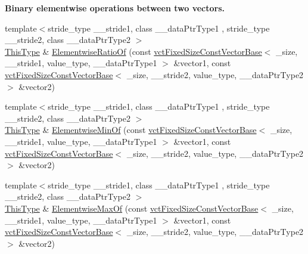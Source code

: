 \begin{Indent}{\bf Binary elementwise operations between two vectors.}
\begin{DoxyCompactItemize}
\item 
{\footnotesize template$<$stride\+\_\+type \+\_\+\+\_\+stride1, class \+\_\+\+\_\+data\+Ptr\+Type1 , stride\+\_\+type \+\_\+\+\_\+stride2, class \+\_\+\+\_\+data\+Ptr\+Type2 $>$ }\\\hyperlink{classvct_fixed_size_const_vector_base_a071063bc4fa43112cc287b2dbef53180}{This\+Type} \& \hyperlink{classvct_fixed_size_vector_base_ae9b3f8f5beb5abec1f56e4bb9e4ea083}{Elementwise\+Ratio\+Of} (const \hyperlink{classvct_fixed_size_const_vector_base}{vct\+Fixed\+Size\+Const\+Vector\+Base}$<$ \+\_\+size, \+\_\+\+\_\+stride1, value\+\_\+type, \+\_\+\+\_\+data\+Ptr\+Type1 $>$ \&vector1, const \hyperlink{classvct_fixed_size_const_vector_base}{vct\+Fixed\+Size\+Const\+Vector\+Base}$<$ \+\_\+size, \+\_\+\+\_\+stride2, value\+\_\+type, \+\_\+\+\_\+data\+Ptr\+Type2 $>$ \&vector2)
\item 
{\footnotesize template$<$stride\+\_\+type \+\_\+\+\_\+stride1, class \+\_\+\+\_\+data\+Ptr\+Type1 , stride\+\_\+type \+\_\+\+\_\+stride2, class \+\_\+\+\_\+data\+Ptr\+Type2 $>$ }\\\hyperlink{classvct_fixed_size_const_vector_base_a071063bc4fa43112cc287b2dbef53180}{This\+Type} \& \hyperlink{classvct_fixed_size_vector_base_a92bef8de3636c3608dff9449331de10d}{Elementwise\+Min\+Of} (const \hyperlink{classvct_fixed_size_const_vector_base}{vct\+Fixed\+Size\+Const\+Vector\+Base}$<$ \+\_\+size, \+\_\+\+\_\+stride1, value\+\_\+type, \+\_\+\+\_\+data\+Ptr\+Type1 $>$ \&vector1, const \hyperlink{classvct_fixed_size_const_vector_base}{vct\+Fixed\+Size\+Const\+Vector\+Base}$<$ \+\_\+size, \+\_\+\+\_\+stride2, value\+\_\+type, \+\_\+\+\_\+data\+Ptr\+Type2 $>$ \&vector2)
\item 
{\footnotesize template$<$stride\+\_\+type \+\_\+\+\_\+stride1, class \+\_\+\+\_\+data\+Ptr\+Type1 , stride\+\_\+type \+\_\+\+\_\+stride2, class \+\_\+\+\_\+data\+Ptr\+Type2 $>$ }\\\hyperlink{classvct_fixed_size_const_vector_base_a071063bc4fa43112cc287b2dbef53180}{This\+Type} \& \hyperlink{classvct_fixed_size_vector_base_a50b46b840249d9b88bd58330cf1d8186}{Elementwise\+Max\+Of} (const \hyperlink{classvct_fixed_size_const_vector_base}{vct\+Fixed\+Size\+Const\+Vector\+Base}$<$ \+\_\+size, \+\_\+\+\_\+stride1, value\+\_\+type, \+\_\+\+\_\+data\+Ptr\+Type1 $>$ \&vector1, const \hyperlink{classvct_fixed_size_const_vector_base}{vct\+Fixed\+Size\+Const\+Vector\+Base}$<$ \+\_\+size, \+\_\+\+\_\+stride2, value\+\_\+type, \+\_\+\+\_\+data\+Ptr\+Type2 $>$ \&vector2)
\item 

\end{DoxyCompactItemize}
\end{Indent}
